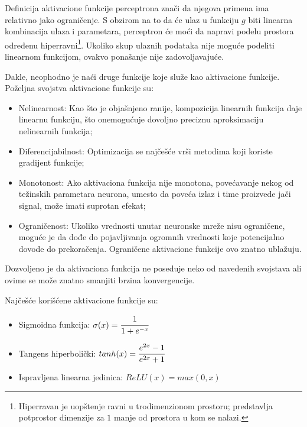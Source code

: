 Definicija aktivacione funkcije perceptrona znači da njegova primena ima relativno jako ograničenje. S obzirom na to da će ulaz u funkciju $g$ biti linearna kombinacija ulaza i parametara, perceptron će moći da napravi podelu prostora određenu hiperravni\footnote{Hiperravan je uopštenje ravni u trodimenzionom prostoru; predstavlja potprostor dimenzije za $1$ manje od prostora u kom se nalazi.}. Ukoliko skup ulaznih podataka nije moguće podeliti linearnom funkcijom, ovakvo ponašanje nije zadovoljavajuće.
\par
Dakle, neophodno je naći druge funkcije koje služe kao aktivacione funkcije. Poželjna svojstva aktivacione funkcije su:
\begin{itemize}
	\item Nelinearnost: Kao što je objašnjeno ranije, kompozicija linearnih funkcija daje linearnu funkciju, što onemogućuje dovoljno preciznu aproksimaciju nelinearnih funkcija;
	\item Diferencijabilnost: Optimizacija se najčešće vrši metodima koji koriste gradijent funkcije;
	\item Monotonost: Ako aktivaciona funkcija nije monotona, povećavanje nekog od težinskih parametara neurona, umesto da poveća izlaz i time proizvede jači signal, može imati suprotan efekat;
	\item Ograničenost: Ukoliko vrednosti unutar neuronske mreže nisu ograničene, moguće je da dođe do pojavljivanja ogromnih vrednosti koje potencijalno dovode do prekoračenja. Ograničene aktivacione funkcije ovo znatno ublažuju. 
\end{itemize}

Dozvoljeno je da aktivaciona funkcija ne poseduje neko od navedenih svojstava ali ovime se može znatno smanjiti brzina konvergencije. 
\par
Najčešće korišćene aktivacione funkcije su:
\begin{itemize}
	\item Sigmoidna funkcija: $\sigma (x) = \cfrac{1}{1+e^{-x}}$
	\item Tangens hiperbolički: $tanh(x) = \cfrac{e^{2x}-1}{e^{2x}+1}$
	\item Ispravljena linearna jedinica: $ReLU(x) = max(0, x)$
\end{itemize}

